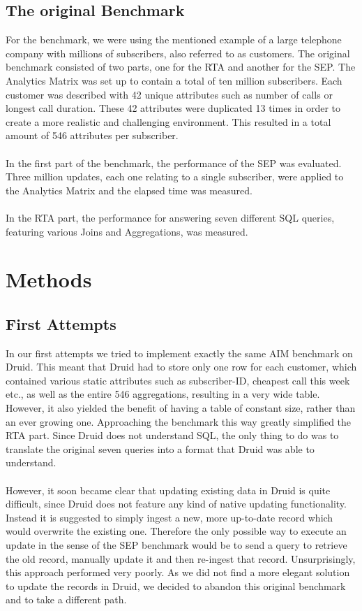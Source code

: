 \documentclass[11pt,singlecolumn]{scrartcl}
\begin{document}
\clearpage

\subsection{The original Benchmark}
For the benchmark, we were using the mentioned example of a large telephone company with millions of subscribers, also referred to as customers. The original benchmark consisted of two parts, one for the RTA and another for the SEP. The Analytics Matrix was set up to contain a total of ten million subscribers. Each customer was described with 42 unique attributes such as number of calls or longest call duration. These 42 attributes were duplicated 13 times in order to create a more realistic and challenging environment. This resulted in a total amount of 546 attributes per subscriber.\\\\
In the first part of the benchmark, the performance of the SEP was evaluated. Three million updates, each one relating to a single subscriber, were applied to the Analytics Matrix and the elapsed time was measured.\\\\In the RTA part, the performance for answering seven different SQL queries, featuring various Joins and Aggregations, was measured. 
\clearpage

\section{Methods}

\subsection{First Attempts}
In our first attempts we tried to implement exactly the same AIM benchmark on Druid. This meant that Druid had to store only one row for each customer, which contained various static attributes such as subscriber-ID, cheapest call this week etc., as well as the entire 546 aggregations, resulting in a very wide table. However, it also yielded the benefit of having a table of constant size, rather than an ever growing one. Approaching the benchmark this way greatly simplified the RTA part. Since Druid does not understand SQL, the only thing to do was to translate the original seven queries into a format that Druid was able to understand.\\\\
However, it soon became clear that updating existing data in Druid is quite difficult, since Druid does not feature any kind of native updating functionality. Instead it is suggested to simply ingest a new, more up-to-date record which would overwrite the existing one. Therefore the only possible way to execute an update in the sense of the SEP benchmark would be to send a query to retrieve the old record, manually update it and then re-ingest that record. Unsurprisingly, this approach performed very poorly. As we did not find a more elegant solution to update the records in Druid, we decided to abandon this original benchmark and to take a different path.    
\\[0.6 cm]
\end{document}
